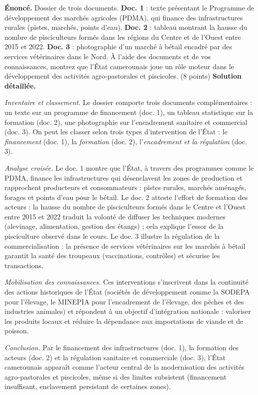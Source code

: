 \documentclass[11pt]{article}
\begin{document}
\begin{exoresolu}
\textbf{Énoncé.} Dossier de trois documents. \textbf{Doc. 1} : texte présentant le Programme de développement des marchés agricoles (PDMA), qui finance des infrastructures rurales (pistes, marchés, points d'eau). \textbf{Doc. 2} : tableau montrant la hausse du nombre de pisciculteurs formés dans les régions du Centre et de l'Ouest entre 2015 et 2022. \textbf{Doc. 3} : photographie d'un marché à bétail encadré par des services vétérinaires dans le Nord. À l'aide des documents et de vos connaissances, montrez que l'État camerounais joue un rôle moteur dans le développement des activités agro-pastorales et piscicoles. (8 points)
\tcblower
\textbf{Solution détaillée.}

\emph{Inventaire et classement.} Le dossier comporte trois documents complémentaires : un texte sur un programme de financement (doc. 1), un tableau statistique sur la formation (doc. 2), une photographie sur l'encadrement sanitaire et commercial (doc. 3). On peut les classer selon trois types d'intervention de l'État : le \emph{financement} (doc. 1), la \emph{formation} (doc. 2), l'\emph{encadrement et la régulation} (doc. 3).

\emph{Analyse croisée.} Le doc. 1 montre que l'État, à travers des programmes comme le PDMA, finance les infrastructures qui désenclavent les zones de production et rapprochent producteurs et consommateurs : pistes rurales, marchés aménagés, forages et points d'eau pour le bétail. Le doc. 2 atteste l'effort de formation des acteurs : la hausse du nombre de pisciculteurs formés dans le Centre et l'Ouest entre 2015 et 2022 traduit la volonté de diffuser les techniques modernes (alevinage, alimentation, gestion des étangs) ; cela explique l'essor de la pisciculture observé dans le cours. Le doc. 3 illustre la régulation de la commercialisation : la présence de services vétérinaires sur les marchés à bétail garantit la santé des troupeaux (vaccinations, contrôles) et sécurise les transactions.

\emph{Mobilisation des connaissances.} Ces interventions s'inscrivent dans la continuité des actions historiques de l'État (sociétés de développement comme la SODEPA pour l'élevage, le MINEPIA pour l'encadrement de l'élevage, des pêches et des industries animales) et répondent à un objectif d'intégration nationale : valoriser les produits locaux et réduire la dépendance aux importations de viande et de poisson.

\emph{Conclusion.} Par le financement des infrastructures (doc. 1), la formation des acteurs (doc. 2) et la régulation sanitaire et commerciale (doc. 3), l'État camerounais apparaît comme l'acteur central de la modernisation des activités agro-pastorales et piscicoles, même si des limites subsistent (financement insuffisant, enclavement persistant de certaines zones).
\end{exoresolu}
\end{document}
